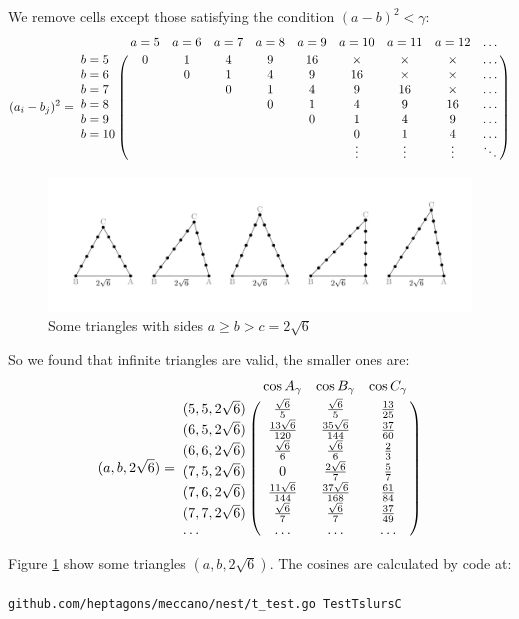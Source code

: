 \documentclass[11pt]{article}
\begin{document}
We remove cells except those satisfying the condition $(a-b)^2 < \gamma$:
\begin {equation}\label{E:21}
(a_i - b_j)^2 =\bordermatrix{~ & a=5 & a=6 & a=7 & a=8 & a=9 & a=10 & a=11 & a=12 & \hdots\cr
b=5  & 0 & 1 & 4 &  9 & 16 & \times & \times & \times & \hdots \cr    
b=6  &   & 0 & 1 &  4 &  9 & 16 & \times & \times & \hdots \cr    
b=7  &   &   & 0 &  1 &  4 &  9 & 16 & \times & \hdots \cr    
b=8  &   &   &   &  0 &  1 &  4 &  9 & 16 & \hdots \cr    
b=9  &   &   &   &    &  0 &  1 &  4 &  9 & \hdots \cr    
b=10 &   &   &   &    &    &  0 &  1 &  4 & \hdots \cr    
 &  &  &  &  &  & \vdots & \vdots & \vdots & \ddots \cr}
\end {equation}

\begin{figure}[htp]
\centering
\includegraphics[scale=0.9]{tslurC}
\caption{Some triangles with sides $a \ge b > c = 2\sqrt{6}$}
\label{tslurC}
\end{figure}

So we found that infinite triangles are valid, the smaller ones are:
\begin {equation}\label{E:4}
(a,b,2\sqrt{6}) =\bordermatrix{~ & \cos{A_{\gamma}} & \cos{B_{\gamma}} & \cos{C_{\gamma}} \cr
(5,5,2\sqrt{6}) & \frac{\sqrt{6}}{5} & \frac{\sqrt{6}}{5} & \frac{13}{25} \cr
(6,5,2\sqrt{6}) & \frac{13\sqrt{6}}{120} & \frac{35\sqrt{6}}{144} & \frac{37}{60} \cr
(6,6,2\sqrt{6}) & \frac{\sqrt{6}}{6} & \frac{\sqrt{6}}{6} & \frac{2}{3} \cr
(7,5,2\sqrt{6}) & 0 & \frac{2\sqrt{6}}{7} & \frac{5}{7} \cr
(7,6,2\sqrt{6}) & \frac{11\sqrt{6}}{144} & \frac{37\sqrt{6}}{168} & \frac{61}{84} \cr
(7,7,2\sqrt{6}) & \frac{\sqrt{6}}{7} & \frac{\sqrt{6}}{7} & \frac{37}{49} \cr
\hdots & \hdots & \hdots & \hdots \cr}
\end{equation}

Figure \ref{tslurC} show some triangles $(a,b,2\sqrt{6})$. The cosines are calculated by code at:
\\\\
\texttt{github.com/heptagons/meccano/nest/t\_test.go TestTslursC}
\end{document}
